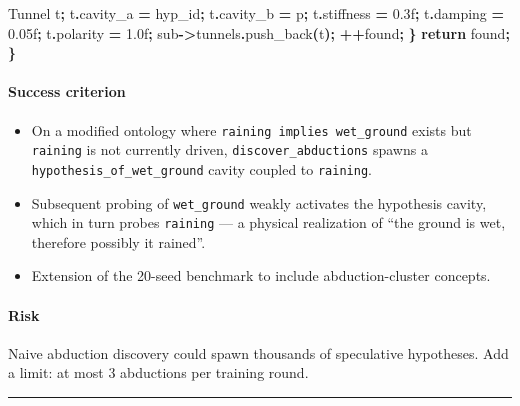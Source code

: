 \documentclass[
  11pt,
  a4paper,
]{article}
\newenvironment{Shaded}{\begin{snugshade}}{\end{snugshade}}
\newcommand{\BuiltInTok}[1]{#1}
\newcommand{\ControlFlowTok}[1]{\textcolor[rgb]{0.13,0.29,0.53}{\textbf{#1}}}
\newcommand{\FloatTok}[1]{\textcolor[rgb]{0.00,0.00,0.81}{#1}}
\newcommand{\NormalTok}[1]{#1}
\newcommand{\OperatorTok}[1]{\textcolor[rgb]{0.81,0.36,0.00}{\textbf{#1}}}
\providecommand{\tightlist}{%
  \setlength{\itemsep}{0pt}\setlength{\parskip}{0pt}}
\begin{document}
\begin{Shaded}
\begin{Highlighting}[]
\NormalTok{        Tunnel t}\OperatorTok{;}
\NormalTok{        t}\OperatorTok{.}\NormalTok{cavity\_a }\OperatorTok{=}\NormalTok{ hyp\_id}\OperatorTok{;}
\NormalTok{        t}\OperatorTok{.}\NormalTok{cavity\_b }\OperatorTok{=}\NormalTok{ p}\OperatorTok{;}
\NormalTok{        t}\OperatorTok{.}\NormalTok{stiffness }\OperatorTok{=} \FloatTok{0.3}\BuiltInTok{f}\OperatorTok{;}
\NormalTok{        t}\OperatorTok{.}\NormalTok{damping }\OperatorTok{=} \FloatTok{0.05}\BuiltInTok{f}\OperatorTok{;}
\NormalTok{        t}\OperatorTok{.}\NormalTok{polarity }\OperatorTok{=} \FloatTok{1.0}\BuiltInTok{f}\OperatorTok{;}
\NormalTok{        sub}\OperatorTok{{-}\textgreater{}}\NormalTok{tunnels}\OperatorTok{.}\NormalTok{push\_back}\OperatorTok{(}\NormalTok{t}\OperatorTok{);}
        \OperatorTok{++}\NormalTok{found}\OperatorTok{;}
    \OperatorTok{\}}
    \ControlFlowTok{return}\NormalTok{ found}\OperatorTok{;}
\OperatorTok{\}}
\end{Highlighting}
\end{Shaded}

\paragraph{Success criterion}\label{success-criterion-6}

\begin{itemize}
\tightlist
\item
  On a modified ontology where \texttt{raining\ implies\ wet\_ground}
  exists but \texttt{raining} is not currently driven,
  \texttt{discover\_abductions} spawns a
  \texttt{hypothesis\_of\_wet\_ground} cavity coupled to
  \texttt{raining}.
\item
  Subsequent probing of \texttt{wet\_ground} weakly activates the
  hypothesis cavity, which in turn probes \texttt{raining} --- a
  physical realization of ``the ground is wet, therefore possibly it
  rained''.
\item
  Extension of the 20-seed benchmark to include abduction-cluster
  concepts.
\end{itemize}

\paragraph{Risk}\label{risk-3}

Naive abduction discovery could spawn thousands of speculative
hypotheses. Add a limit: at most 3 abductions per training round.

\begin{center}\rule{0.5\linewidth}{0.5pt}\end{center}
\end{document}
